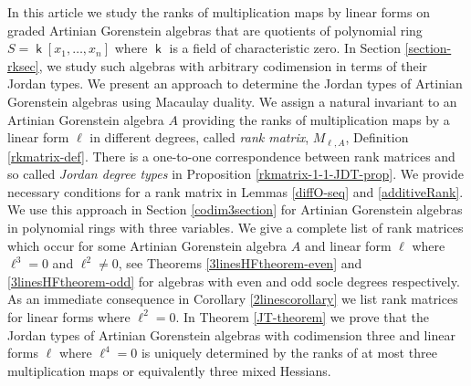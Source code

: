 \documentclass[12pt]{amsart}
\numberwithin{equation}{section}
\theoremstyle{plain} \newtheorem{theorem}{Theorem}[section]
\theoremstyle{definition} \newtheorem{definition}[theorem]{Definition}
\DeclareMathOperator{\K}{\mathsf{k}}
\begin{document}
In this article we  study the ranks of multiplication maps by linear forms on graded Artinian  Gorenstein algebras that are quotients of polynomial ring $S = \K[x_1,\dots ,x_n]$ where $\K$ is a field of characteristic zero. In Section \ref{section-rksec},  we study such algebras with arbitrary codimension in terms of their Jordan types. We present an approach to determine the Jordan types of Artinian    Gorenstein algebras using Macaulay duality. We assign a natural invariant to an Artinian    Gorenstein algebra $A$ providing the ranks of multiplication maps by a linear form $\ell$ in different degrees, called \emph{rank matrix}, $M_{\ell,A}$,  Definition \ref{rkmatrix-def}. There is a one-to-one correspondence between rank matrices and so called \emph{Jordan degree types} in Proposition \ref{rkmatrix-1-1-JDT-prop}. We provide necessary conditions for a rank matrix in Lemmas \ref{diffO-seq} and \ref{additiveRank}.
We use this approach in Section  \ref{codim3section} for Artinian Gorenstein algebras in polynomial rings with three variables. We give a complete list of rank matrices which occur for some Artinian Gorenstein algebra $A$ and linear form $\ell$ where $\ell^3=0$ and $\ell^2\neq 0$, see Theorems \ref{3linesHFtheorem-even} and \ref{3linesHFtheorem-odd} for algebras with even and odd socle degrees respectively. As an immediate consequence in Corollary \ref{2linescorollary} we list rank matrices for linear forms where $\ell^2=0$. 
In Theorem \ref{JT-theorem} we prove that the Jordan types of Artinian Gorenstein algebras with codimension three and linear forms $\ell$ where $\ell^4=0$ is uniquely determined by the ranks of at most three multiplication maps or equivalently three mixed Hessians.
\end{document}
